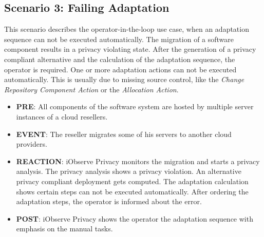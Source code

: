 \subsection{Scenario 3: Failing Adaptation}
\label{eval:scenario:3}
This scenario describes the operator-in-the-loop use case, when an adaptation sequence can not be executed automatically. The migration of a software component results in a privacy violating state. After the generation of a privacy compliant alternative and the calculation of the adaptation sequence, the operator is required. One or more adaptation actions can not be executed automatically. This is usually due to missing source control, like the \textit{Change Repository Component Action} or the \textit{Allocation Action}.
\begin{itemize}
	\setlength\itemsep{0em}
	\item \textbf{PRE}: All components of the software system are hosted by multiple server instances of a cloud resellers. 
	\item \textbf{EVENT}: The reseller migrates some of his servers to another cloud providers.
	\item \textbf{REACTION}: iObserve Privacy monitors the migration and starts a privacy analysis. The privacy analysis shows a privacy violation. An alternative privacy compliant deployment gets computed. The adaptation calculation shows certain steps can not be executed automatically. After ordering the adaptation steps, the operator is informed about the error.
	\item \textbf{POST}: iObserve Privacy shows the operator the adaptation sequence with emphasis on the manual tasks.
\end{itemize}


